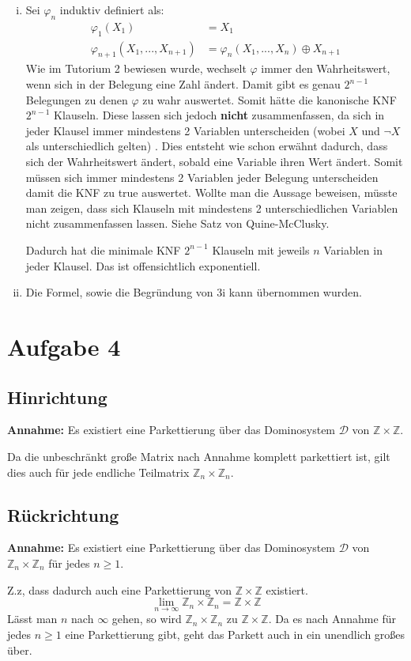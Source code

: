 \documentclass[a4paper,10pt]{article}
\begin{document}
\begin{enumerate}[(i)]
\item Sei $\varphi_n$ induktiv definiert als:
\begin{align*}
\varphi_1(X_1) &= X_1 \\
\varphi_{n+1}(X_1,...,X_{n+1}) &= \varphi_n(X_1,...,X_n) \oplus X_{n+1}
\end{align*}
Wie im Tutorium 2 bewiesen wurde, wechselt $\varphi$ immer den Wahrheitswert, wenn sich in der Belegung eine Zahl ändert. Damit gibt es genau $2^{n-1}$ Belegungen zu denen $\varphi$ zu wahr auswertet. Somit hätte die kanonische KNF $2^{n-1}$ Klauseln. Diese lassen sich jedoch \textbf{nicht} zusammenfassen, da sich in jeder Klausel immer mindestens 2 Variablen unterscheiden (wobei $X$ und $\lnot X$ als unterschiedlich gelten) . Dies entsteht wie schon erwähnt dadurch, dass sich der Wahrheitswert ändert, sobald eine Variable ihren Wert ändert. Somit müssen sich immer mindestens 2 Variablen jeder Belegung unterscheiden damit die KNF zu \textsf{true} auswertet. Wollte man die Aussage beweisen, müsste man zeigen, dass sich Klauseln mit mindestens 2 unterschiedlichen Variablen nicht zusammenfassen lassen. Siehe Satz von Quine-McClusky.

 Dadurch hat die minimale KNF $2^{n-1}$ Klauseln mit jeweils $n$ Variablen in jeder Klausel. Das ist offensichtlich exponentiell.

\item Die Formel, sowie die Begründung von 3i kann übernommen wurden.
\end{enumerate}

\section*{Aufgabe 4}
\subsection{Hinrichtung}
\textbf{Annahme:} Es existiert eine Parkettierung über das Dominosystem $\mathcal D$ von $\mathbb{Z} \times \mathbb{Z}$.

Da die unbeschränkt große Matrix nach Annahme komplett parkettiert ist, gilt dies auch für jede endliche Teilmatrix $\mathbb{Z}_n \times \mathbb{Z}_n$.
%
\subsection{Rückrichtung}
\textbf{Annahme:} Es existiert eine Parkettierung über das Dominosystem $\mathcal D$ von $\mathbb{Z}_n \times \mathbb{Z}_n$ für jedes $n \ge 1$.

Z.z, dass dadurch auch eine Parkettierung von $\mathbb{Z} \times \mathbb{Z}$ existiert.
$$\lim_{n \to \infty} \mathbb{Z}_n \times \mathbb{Z}_n = \mathbb{Z} \times \mathbb{Z}$$
Lässt man $n$ nach $\infty$ gehen, so wird $\mathbb{Z}_n \times \mathbb{Z}_n$ zu $\mathbb{Z} \times \mathbb{Z}$. Da es nach Annahme für jedes $n \ge 1$ eine Parkettierung gibt, geht das Parkett auch in ein unendlich großes über.
\end{document}

